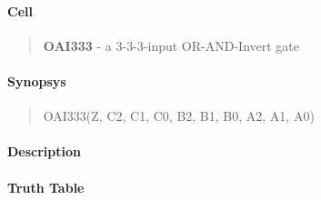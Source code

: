 \label{OAI333}
\paragraph{Cell}
\begin{quote}
    \textbf{OAI333} - a 3-3-3-input OR-AND-Invert gate
\end{quote}

\paragraph{Synopsys}
\begin{quote}
    OAI333(Z, C2, C1, C0, B2, B1, B0, A2, A1, A0)
\end{quote}

\paragraph{Description}



\paragraph{Truth Table}


